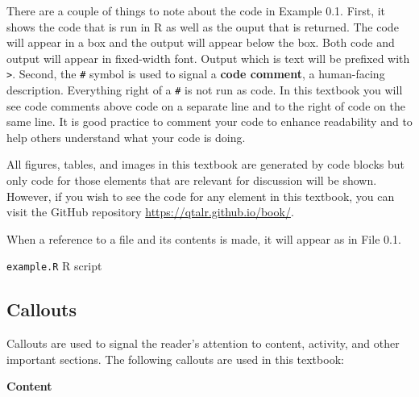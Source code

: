 \documentclass[
  letterpaper,
  DIV=11,
  numbers=noendperiod]{scrreprt}
\newenvironment{Shaded}{\begin{snugshade}}{\end{snugshade}}
\newcommand{\CommentTok}[1]{\textcolor[rgb]{0.00,0.00,0.00}{\textit{#1}}}
\newcommand{\DecValTok}[1]{\textcolor[rgb]{0.00,0.00,0.00}{#1}}
\newcommand{\FunctionTok}[1]{\textcolor[rgb]{0.00,0.00,0.00}{#1}}
\newcommand{\NormalTok}[1]{\textcolor[rgb]{0.00,0.00,0.00}{#1}}
\newcommand{\SpecialCharTok}[1]{\textcolor[rgb]{0.00,0.00,0.00}{#1}}
\theoremstyle{definition}
\theoremstyle{remark}
\begin{document}
There are a couple of things to note about the code in Example 0.1.
First, it shows the code that is run in R as well as the ouput that is
returned. The code will appear in a box and the output will appear below
the box. Both code and output will appear in fixed-width font. Output
which is text will be prefixed with \texttt{\textgreater{}}. Second, the
\texttt{\#} symbol is used to signal a \textbf{code comment}, a
human-facing description. Everything right of a \texttt{\#} is not run
as code. In this textbook you will see code comments above code on a
separate line and to the right of code on the same line. It is good
practice to comment your code to enhance readability and to help others
understand what your code is doing.

All figures, tables, and images in this textbook are generated by code
blocks but only code for those elements that are relevant for discussion
will be shown. However, if you wish to see the code for any element in
this textbook, you can visit the GitHub repository
\url{https://qtalr.github.io/book/}.

When a reference to a file and its contents is made, it will appear as
in File 0.1.

\begin{codelisting}

\caption{\label{lst-r-code}\texttt{example.R} R script}

\centering{

\begin{Shaded}
\begin{Highlighting}[]
\CommentTok{\# Load libraries}
\FunctionTok{library}\NormalTok{(tidyverse)}

\CommentTok{\# Add 1 and 1}
\DecValTok{1} \SpecialCharTok{+} \DecValTok{1}
\end{Highlighting}
\end{Shaded}

}

\end{codelisting}%

\subsection*{Callouts}\label{sec-p-callouts}

Callouts are used to signal the reader's attention to content, activity,
and other important sections. The following callouts are used in this
textbook:

\textbf{Content}
\end{document}
